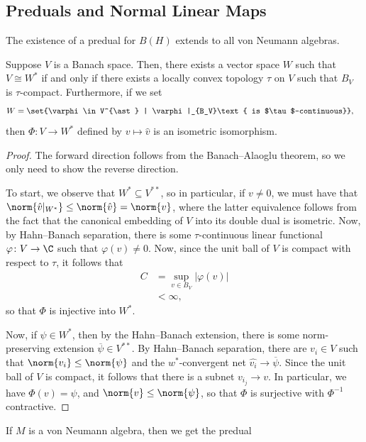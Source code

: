 \documentclass[10pt]{mypackage}
\begin{document}
\subsection{Preduals and Normal Linear Maps}%
The existence of a predual for $B(H)$ extends to all von Neumann algebras.
\begin{theorem}
  Suppose $V$ is a Banach space. Then, there exists a vector space $W$ such that $V\cong W^{\ast}$ if and only if there exists a locally convex topology $\tau$ on $V$ such that $B_V$ is $\tau$-compact. Furthermore, if we set
  \begin{align*}
    W &= \set{\varphi\in V^{\ast} | \varphi|_{B_V}\text{ is $\tau$-continuous}},
  \end{align*}
  then $\Phi\colon V\rightarrow W^{\ast}$ defined by $v\mapsto \hat{v}$ is an isometric isomorphism.
\end{theorem}
\begin{proof}
  The forward direction follows from the Banach--Alaoglu theorem, so we only need to show the reverse direction.

  To start, we observe that $W^{\ast}\subseteq V^{\ast\ast}$, so in particular, if $v\neq 0$, we must have that $\norm{\hat{v}|_{W^{\ast}}}\leq \norm{\hat{v}} = \norm{v}$, where the latter equivalence follows from the fact that the canonical embedding of $V$ into its double dual is isometric. Now, by Hahn--Banach separation, there is some $\tau$-continuous linear functional $\varphi\colon V\rightarrow \C$ such that $\varphi(v)\neq 0$. Now, since the unit ball of $V$ is compact with respect to $\tau$, it follows that
  \begin{align*}
    C &= \sup_{v\in B_V} \left\vert \varphi(v) \right\vert\\
      &< \infty,
  \end{align*}
  so that $\Phi$ is injective into $W^{\ast}$.

  Now, if $\psi\in W^{\ast}$, then by the Hahn--Banach extension, there is some norm-preserving extension $ \overline{\psi}\in V^{\ast\ast} $. By Hahn--Banach separation, there are $v_i\in V$ such that $\norm{v_i}\leq \norm{\psi}$ and the $w^{\ast}$-convergent net $\hat{v_i}\rightarrow \overline{\psi}$. Since the unit ball of $V$ is compact, it follows that there is a subnet $v_{i_j}\rightarrow v$. In particular, we have $\Phi(v) = \psi$, and $\norm{v}\leq \norm{\psi}$, so that $\Phi$ is surjective with $\Phi^{-1}$ contractive.
\end{proof}
If $M$ is a von Neumann algebra, then we get the predual
\end{document}
